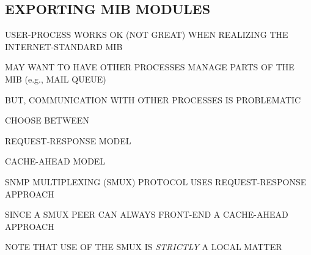 

\begin{bwslide}
\part	{EXPORTING MIB MODULES}\bf

\begin{nrtc}
\item	USER-PROCESS WORKS OK (NOT GREAT) WHEN REALIZING THE
	INTERNET-STANDARD MIB

\item	MAY WANT TO HAVE OTHER PROCESSES MANAGE PARTS OF THE MIB
	(e.g., MAIL QUEUE)

\item	BUT, COMMUNICATION WITH OTHER PROCESSES IS PROBLEMATIC
\end{nrtc}
\end{bwslide}


\begin{bwslide}

\begin{nrtc}
\item	CHOOSE BETWEEN
    \begin{nrtc}
    \item	REQUEST-RESPONSE MODEL

    \item	CACHE-AHEAD MODEL
    \end{nrtc}

\item	SNMP MULTIPLEXING (SMUX) PROTOCOL USES REQUEST-RESPONSE APPROACH
    \begin{nrtc}
    \item	SINCE A SMUX PEER CAN ALWAYS FRONT-END A CACHE-AHEAD APPROACH
    \end{nrtc}

\item	NOTE THAT USE OF THE SMUX IS \emph{STRICTLY} A LOCAL MATTER
\end{nrtc}
\end{bwslide}


